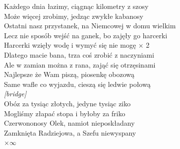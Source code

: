 \documentclass[a5paper, 10pt]{book}
\begin{document}
\begin{minipage}[t]{0.8\textwidth}
  Każdego dnia łazimy, ciągnąc kilometry z szosy\\
  Może więcej zrobimy, jedząc zwykłe kabanosy \\
  Ostatni nasz przystanek, na Niemcowej w domu wielkim\\
  Lecz nie sposób wejść na ganek, bo zajęły go harcerki \vspace*{2mm}
  \\
  \hspace*{5mm}Harcerki wzięły wodę i wymyć się nie mogę $\times$ 2\vspace*{2mm}
  \\
  Dlatego macie bana, trza coś zrobić z naczyniami\\
  Ale w zamian można z rana, zająć się otrzęsinami \\
  Najlepsze że Wam piszą, piosenkę obozową\\
  Same wafle co wyjazdu, cieszą się ledwie połową \vspace*{2mm}
  \\
  {\small \textit{[bridge]}} \vspace*{2mm}
  \\
  \hspace*{5mm}Obóz za tysiąc złotych, jedyne tysiąc ziko\\
  \hspace*{5mm}Mogliśmy złapać stopa i byłoby za friko \vspace*{2mm}
  \\
  \hspace*{10mm}Czerwononosy Olek, namiot nieposkładany\\
  \hspace*{10mm}Zamknięta Radziejowa, a Szefu niewyspany\\
  \hspace*{2cm}$\times \infty $

\end{minipage}
\begin{minipage}[t]{0.2\textwidth}
\end{minipage}

\newpage
\end{document}
